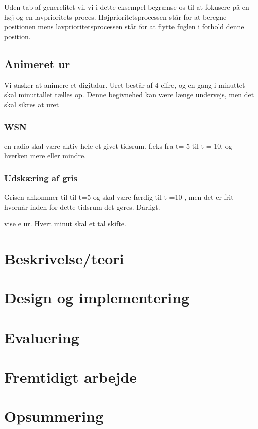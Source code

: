 Uden tab af generelitet vil vi i dette eksempel begrænse os til at fokusere på en høj og en lavprioritets proces. Højprioritetsprocessen står for at beregne positionen mens lavprioritetsprocessen står for at flytte fuglen i forhold denne position.




\subsection{Animeret ur}

Vi ønsker at animere et digitalur. Uret består af 4 cifre, og en gang i minuttet skal minuttallet tælles op. Denne begivnehed kan være længe undervejs, men det skal sikres at uret 

\subsubsection{WSN}
en radio skal være aktiv hele et givet tidsrum. f.eks fra t= 5 til t = 10. og hverken mere eller mindre.

\subsubsection*{Udskæring af gris}
Grisen ankommer til til t=5 og skal være færdig til t =10 , men det er frit hvornår inden for dette tidsrum det gøres.
Dårligt.

vise e ur. Hvert minut skal et tal skifte. 

  \section{Beskrivelse/teori}
  \section{Design og implementering}
  \section{Evaluering}
  \section{Fremtidigt arbejde}
  \section{Opsummering}
